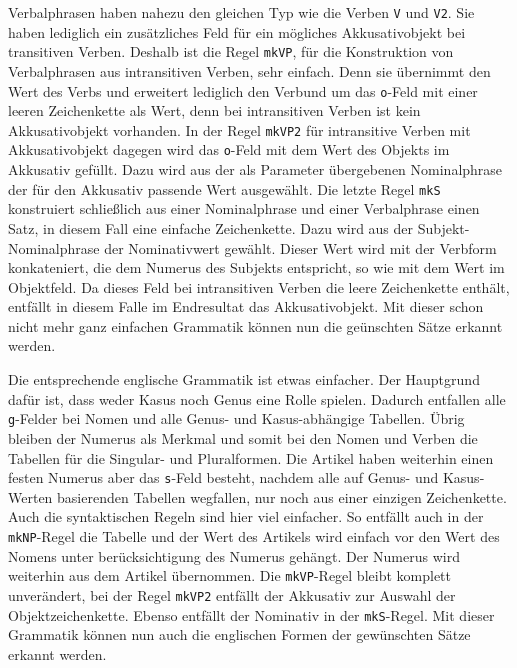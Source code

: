 \documentclass[12pt,abstract=on,titlepage,bibliography=totoc,ngerman,listof=totoc]{scrreprt}
\begin{document}
Verbalphrasen haben nahezu den gleichen Typ wie die Verben \texttt{V} und \texttt{V2}. Sie haben lediglich ein zusätzliches Feld für ein mögliches Akkusativobjekt bei transitiven Verben. Deshalb ist die Regel \texttt{mkVP}, für die Konstruktion von Verbalphrasen aus intransitiven Verben, sehr einfach. Denn sie übernimmt den Wert des Verbs und erweitert lediglich den Verbund um das \texttt{o}-Feld mit einer leeren Zeichenkette als Wert, denn bei intransitiven Verben ist kein Akkusativobjekt vorhanden. In der Regel \texttt{mkVP2} für intransitive Verben mit Akkusativobjekt dagegen wird das \texttt{o}-Feld mit dem Wert des Objekts im Akkusativ gefüllt. Dazu wird aus der als Parameter übergebenen Nominalphrase der für den Akkusativ passende Wert ausgewählt. Die letzte Regel \texttt{mkS} konstruiert schließlich aus einer Nominalphrase und einer Verbalphrase einen Satz, in diesem Fall eine einfache Zeichenkette. Dazu wird aus der Subjekt-Nominalphrase der Nominativwert gewählt. Dieser Wert wird mit der Verbform konkateniert, die dem Numerus des Subjekts entspricht, so wie mit dem Wert im Objektfeld. Da dieses Feld bei intransitiven Verben die leere Zeichenkette enthält, entfällt in diesem Falle im Endresultat das Akkusativobjekt. Mit dieser schon nicht mehr ganz einfachen Grammatik können nun die geünschten Sätze erkannt werden. \par

Die entsprechende englische Grammatik ist etwas einfacher. Der Hauptgrund dafür ist, dass weder Kasus noch Genus eine Rolle spielen. Dadurch entfallen alle \texttt{g}-Felder bei Nomen und alle Genus- und Kasus-abhängige Tabellen. Übrig bleiben der Numerus als Merkmal und somit bei den Nomen und Verben die Tabellen für die Singular- und Pluralformen. Die Artikel haben weiterhin einen festen Numerus aber das \texttt{s}-Feld besteht, nachdem alle auf Genus- und Kasus-Werten basierenden Tabellen wegfallen, nur noch aus einer einzigen Zeichenkette. Auch die syntaktischen Regeln sind hier viel einfacher. So entfällt auch in der \texttt{mkNP}-Regel die Tabelle und der Wert des Artikels wird einfach vor den Wert des Nomens unter berücksichtigung des Numerus gehängt. Der Numerus wird weiterhin aus dem Artikel übernommen. Die \texttt{mkVP}-Regel bleibt komplett unverändert, bei der Regel \texttt{mkVP2} entfällt der Akkusativ zur Auswahl der Objektzeichenkette. Ebenso entfällt der Nominativ in der \texttt{mkS}-Regel. Mit dieser Grammatik können nun auch die englischen Formen der gewünschten Sätze erkannt werden. \par
\end{document}
